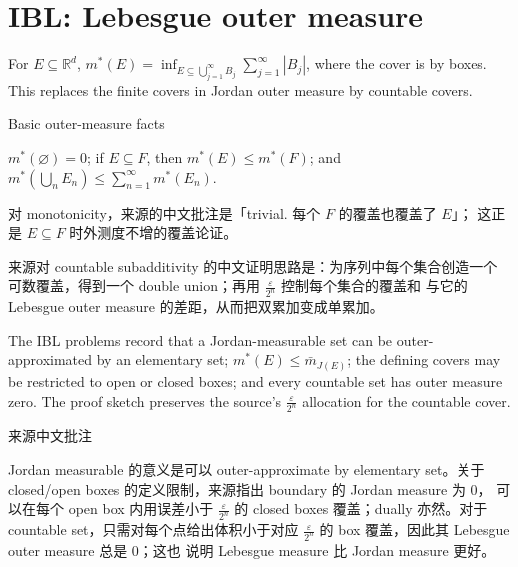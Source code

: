 \chapter{IBL: Lebesgue outer measure}

\begin{definition}{}

For \(E \subseteq \mathbb{R}^{d}\), \(m^{\ast}(E) = \inf_{E \subseteq \bigcup_{j = 1}^{\infty}B_{j}}\sum_{j = 1}^{\infty}\left| B_{j} \right|\), where the cover is by boxes. This replaces the finite covers in Jordan outer measure by countable covers.

\end{definition}

\begin{theorem}{Basic outer-measure facts}

\(m^{\ast}(\varnothing) = 0\); if \(E \subseteq F\), then \(m^{\ast}(E) \leq m^{\ast}(F)\); and \(m^{\ast}\left( {\bigcup_{n}E_{n}} \right) \leq \sum_{n = 1}^{\infty}m^{\ast}\left( E_{n} \right)\).

\end{theorem}

对 monotonicity，来源的中文批注是「trivial. 每个 \(F\) 的覆盖也覆盖了 \(E\)」； 这正是 \(E \subseteq F\) 时外测度不增的覆盖论证。

来源对 countable subadditivity 的中文证明思路是：为序列中每个集合创造一个 可数覆盖，得到一个 double union；再用 \(\frac{\varepsilon}{2^{n}}\) 控制每个集合的覆盖和 与它的 Lebesgue outer measure 的差距，从而把双累加变成单累加。

The IBL problems record that a Jordan-measurable set can be outer-approximated by an elementary set; \(m^{\ast}(E) \leq {\bar{m}}_{J{(E)}}\); the defining covers may be restricted to open or closed boxes; and every countable set has outer measure zero. The proof sketch preserves the source's \(\frac{\varepsilon}{2^{n}}\) allocation for the countable cover.

\begin{qlremark}{来源中文批注}

Jordan measurable 的意义是可以 outer-approximate by elementary set。关于 closed/open boxes 的定义限制，来源指出 boundary 的 Jordan measure 为 \(0\)， 可以在每个 open box 内用误差小于 \(\frac{\varepsilon}{2^{n}}\) 的 closed boxes 覆盖；dually 亦然。对于 countable set，只需对每个点给出体积小于对应 \(\frac{\varepsilon}{2^{n}}\) 的 box 覆盖，因此其 Lebesgue outer measure 总是 \(0\)；这也 说明 Lebesgue measure 比 Jordan measure 更好。

\end{qlremark}

